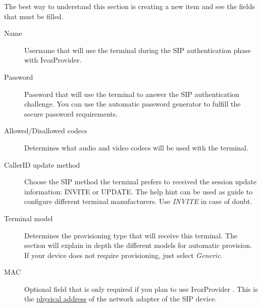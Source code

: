 \documentclass[letterpaper,10pt,spanish]{sphinxmanual}
\begin{document}
The best way to understand this section is creating a new item and see the
fields that must be filled.
\begin{description}
\item[{Name}] \leavevmode{}\label{administration_portal/client/vpbx/terminals:term-name}
Username that will use the terminal during the SIP authentication phase
with IvozProvider.

\item[{Password}] \leavevmode{}\label{administration_portal/client/vpbx/terminals:term-password}
Password that will use the terminal to answer the SIP authentication
challenge. You can use the automatic password generator to fulfill the
secure password requirements.

\item[{Allowed/Disallowed codecs}] \leavevmode{}\label{administration_portal/client/vpbx/terminals:term-allowed-disallowed-codecs}
Determines what audio and video codecs will be used with the terminal.

\item[{CallerID update method}] \leavevmode{}\label{administration_portal/client/vpbx/terminals:term-callerid-update-method}
Choose the SIP method the terminal prefers to received the session
update information: INVITE or UPDATE. The help hint can be used as
guide to configure different terminal manufacturers. Use \emph{INVITE} in
case of doubt.

\item[{Terminal model}] \leavevmode{}\label{administration_portal/client/vpbx/terminals:term-terminal-model}
Determines the provisioning type that will receive this terminal.
The section {\hyperref[administration_portal/platform/terminal_manufacturers:provisioning]{}} will explain
in depth the different models for automatic provision. If your device
does not require provisioning, just select \emph{Generic}.

\item[{MAC}] \leavevmode{}\label{administration_portal/client/vpbx/terminals:term-mac}
Optional field that is only required if you plan to use IvozProvider
{\hyperref[administration_portal/platform/terminal_manufacturers:provisioning]{}}. This is the \href{https://wikipedia.org/wiki/MAC\_Address}{physical
address} of the network
adapter of the SIP device.


\end{description}
\end{document}
